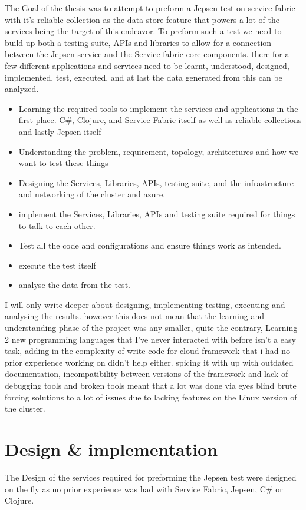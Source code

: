 \documentclass[a4paper,10pt,titlepage]{report}
\begin{document}
The Goal of the thesis was to attempt to preform a Jepsen test on service fabric with it's reliable collection as the data store feature that powers a lot of the services being the target of this endeavor. To preform such a test we need to build up both a testing suite, APIs and libraries to allow for a connection between the Jepsen service and the Service fabric core components. there for a few different applications and services need to be learnt, understood, designed, implemented, test, executed, and at last the data generated from this can be analyzed.
\begin{itemize}
    \item Learning the required tools to implement the services and applications in the first place. C\#, Clojure, and Service Fabric itself as well as reliable collections and lastly Jepsen itself
    \item Understanding the problem, requirement, topology, architectures and how we want to test these things
    \item Designing the Services, Libraries, APIs, testing suite, and the infrastructure and networking of the cluster and azure.
    \item implement the  Services, Libraries, APIs and testing suite required for things to talk to each other.
    \item Test all the code and configurations and ensure things work as intended.
    \item execute the test itself
    \item analyse the data from the test.
\end{itemize}

I will only write deeper about designing, implementing testing, executing and analysing the results. however this does not mean that the learning and understanding phase of the project was any smaller, quite the contrary, Learning 2 new programming languages that I've never interacted with before isn't a easy task, adding in the complexity of write code for cloud framework that i had no prior experience working on didn't help either. spicing it with up with outdated documentation, incompatibility between versions of the framework and lack of debugging tools and broken tools meant that a lot was done via eyes blind brute forcing solutions to a lot of issues due to lacking features on the Linux version of the cluster.\\

\section{Design \& implementation}
The Design of the services required for preforming the Jepsen test were designed on the fly as no prior experience was had with Service Fabric, Jepsen, C\# or Clojure.
\end{document}
